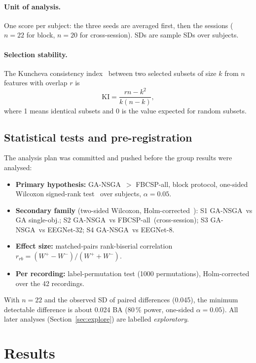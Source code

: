 \documentclass[11pt,a4paper]{article}
\newcommand{\ga}{GA-NSGA}
\newcommand{\gas}{GA single-obj.}
\newcommand{\fb}{FBCSP-all}
\begin{document}
\paragraph{Unit of analysis.} One score per subject: the three seeds are averaged first, then the
sessions ($n=22$ for block, $n=20$ for cross-session). SDs are sample SDs over subjects.

\paragraph{Selection stability.} The Kuncheva consistency index~\cite{kuncheva2007} between two selected
subsets of size $k$ from $n$ features with overlap $r$ is
\begin{equation}
  \mathrm{KI}=\frac{rn-k^2}{k(n-k)},
\end{equation}
where 1 means identical subsets and 0 is the value expected for random subsets.

\subsection{Statistical tests and pre-registration}
The analysis plan was committed and pushed before the group results were analysed:
\begin{itemize}
  \item \textbf{Primary hypothesis:} \ga\ $>$ \fb, block protocol, one-sided Wilcoxon signed-rank
        test~\cite{wilcoxon1945} over subjects, $\alpha=0.05$.
  \item \textbf{Secondary family} (two-sided Wilcoxon, Holm-corrected~\cite{holm1979}): S1 \ga\ vs
        \gas; S2 \ga\ vs \fb\ (cross-session); S3 \ga\ vs EEGNet-32; S4 \ga\ vs EEGNet-8.
  \item \textbf{Effect size:} matched-pairs rank-biserial correlation $r_{rb}=(W^+-W^-)/(W^++W^-)$.
  \item \textbf{Per recording:} label-permutation test (1000 permutations), Holm-corrected over the 42
        recordings.
\end{itemize}
With $n=22$ and the observed SD of paired differences (0.045), the minimum detectable difference is about
0.024 BA (80\,\% power, one-sided $\alpha=0.05$). All later analyses (Section~\ref{sec:explore}) are
labelled \emph{exploratory}.

\section{Results}
\end{document}

